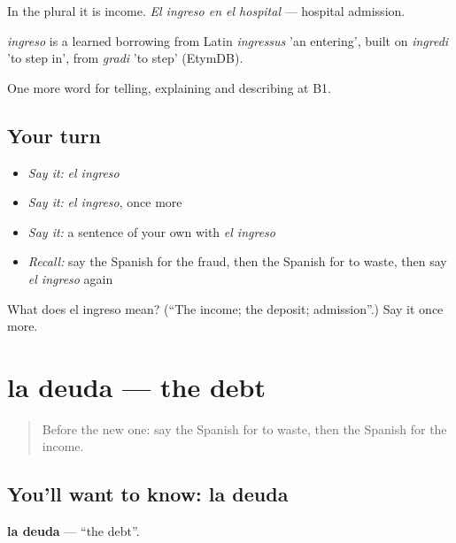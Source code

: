 In the plural it is income. \emph{El ingreso en el hospital} — hospital admission.

\begin{cousinweb}
\emph{ingreso} is a learned borrowing from Latin \emph{ingressus} 'an entering', built on \emph{ingredi} 'to step in', from \emph{gradi} 'to step' (EtymDB).
\end{cousinweb}

\begin{grammarlens}[title={What you've built}]
One more word for telling, explaining and describing at B1.
\end{grammarlens}

\subsection*{Your turn}
\begin{itemize}
\raggedright
  \item \emph{Say it:} \emph{el ingreso}
  \item \emph{Say it:} \emph{el ingreso}, once more
  \item \emph{Say it:} a sentence of your own with \emph{el ingreso}
  \item \emph{Recall:} say the Spanish for the fraud, then the Spanish for to waste, then say \emph{el ingreso} again
\end{itemize}

\begin{tcolorbox}[breakable,colback=teal!4,colframe=teal!35!black,title={Before you move on}]
What does el ingreso mean? (\textquotedblleft{}The income; the deposit; admission\textquotedblright{}.) Say it once more.
\end{tcolorbox}
\section[la deuda]{la deuda — the debt}

\label{lesson:ES-C627-deuda}



\begin{quote}
Before the new one: say the Spanish for to waste, then the Spanish for the income.
\end{quote}

\subsection*{You'll want to know: la deuda}
\textbf{la deuda} — \textquotedblleft{}the debt\textquotedblright{}.

